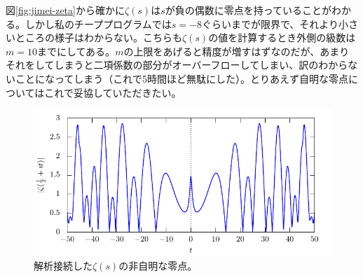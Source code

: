 \documentclass[11pt,b5paper,papersize,dvipdfmx]{jsbook}
\begin{document}
%
図\ref{fig:jimei-zeta}から確かに$\zeta(s)$は$s$が負の偶数に零点を持っていることがわかる。しかし私のチーププログラムでは$s=-8$ぐらいまでが限界で、それより小さいところの様子はわからない。こちらも$\zeta(s)$の値を計算するとき外側の級数は$m=10$までにしてある。$m$の上限をあげると精度が増すはずなのだが、あまりそれをしてしまうと二項係数の部分がオーバーフローしてしまい、訳のわからないことになってしまう（これで5時間ほど無駄にした）。とりあえず自明な零点についてはこれで妥協していただきたい。\par
%
\begin{figure}[H]
  \centering
  \includegraphics{nkym/gnuplot/zeta02/hijimei-main.pdf}
  \caption{解析接続した$\zeta(s)$の非自明な零点。}
  \label{fig:hijimei-zeta}
\end{figure}
%

\clearpage
\end{document}

